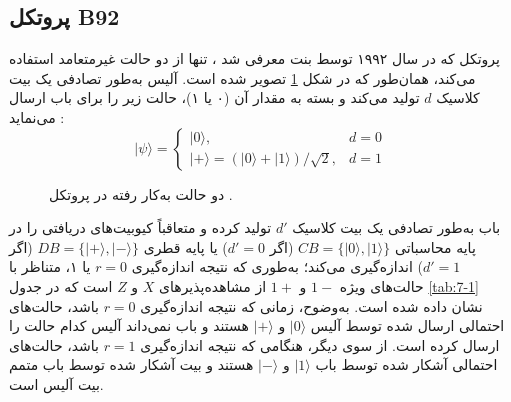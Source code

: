 \subsection{پروتکل B92}
\label{subsec:7-3-2}
پروتکل  که در سال ۱۹۹۲ توسط بنت معرفی شد \cite{7-36}، تنها از دو حالت غیرمتعامد استفاده می‌کند، همان‌طور که در شکل \ref{fig:7-7} تصویر شده است. آلیس به‌طور تصادفی یک بیت کلاسیک $d$ تولید می‌کند و بسته به مقدار آن (۰ یا ۱)، حالت زیر را برای باب ارسال می‌نماید \cite{7-6}:
\begin{equation}
	|\psi\rangle = \begin{cases} 
		|0\rangle, & d = 0 \\ 
		|+\rangle = (|0\rangle + |1\rangle)/\sqrt{2}, & d = 1 
	\end{cases}
	\label{eq:7-21}
\end{equation}

\begin{figure}[ht]
	\centering
	\caption{دو حالت به‌کار رفته در پروتکل .}
	\label{fig:7-7}
\end{figure}

باب به‌طور تصادفی یک بیت کلاسیک $d'$ تولید کرده و متعاقباً کیوبیت‌های دریافتی را در پایه محاسباتی $CB = \{|0\rangle, |1\rangle\}$ (اگر $d'=0$) یا پایه قطری $DB = \{|+\rangle, |-\rangle\}$ (اگر $d'=1$) اندازه‌گیری می‌کند؛ به‌طوری که نتیجه اندازه‌گیری $r=0$ یا ۱، متناظر با حالت‌های ویژه $1-$ و $1+$ از مشاهده‌پذیرهای $X$ و $Z$ است که در جدول \ref{tab:7-1} نشان داده شده است. به‌وضوح، زمانی که نتیجه اندازه‌گیری $r=0$ باشد، حالت‌های احتمالی ارسال شده توسط آلیس $|0\rangle$ و $|+\rangle$ هستند و باب نمی‌داند آلیس کدام حالت را ارسال کرده است. از سوی دیگر، هنگامی که نتیجه اندازه‌گیری $r=1$ باشد، حالت‌های احتمالی آشکار شده توسط باب $|1\rangle$ و $|-\rangle$ هستند و بیت آشکار شده توسط باب متمم بیت آلیس است.





